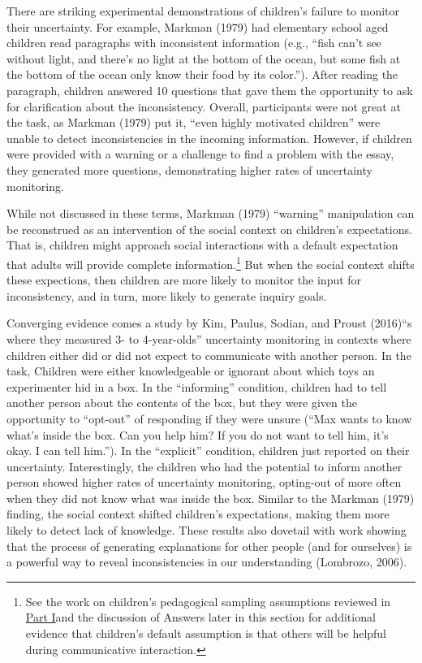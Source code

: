 \documentclass[english,floatsintext,man]{apa6}
\theoremstyle{definition}
\theoremstyle{definition}
\theoremstyle{definition}
\theoremstyle{remark}
\begin{document}
There are striking experimental demonstrations of children's failure to
monitor their uncertainty. For example, Markman (1979) had elementary
school aged children read paragraphs with inconsistent information
(e.g., \enquote{fish can't see without light, and there's no light at
the bottom of the ocean, but some fish at the bottom of the ocean only
know their food by its color.}). After reading the paragraph, children
answered 10 questions that gave them the opportunity to ask for
clarification about the inconsistency. Overall, participants were not
great at the task, as Markman (1979) put it, \enquote{even highly
motivated children} were unable to detect inconsistencies in the
incoming information. However, if children were provided with a warning
or a challenge to find a problem with the essay, they generated more
questions, demonstrating higher rates of uncertainty monitoring.

While not discussed in these terms, Markman (1979) \enquote{warning}
manipulation can be reconstrued as an intervention of the social context
on children's expectations. That is, children might approach social
interactions with a default expectation that adults will provide
complete information.\footnote{See the work on children's pedagogical
  sampling assumptions reviewed in \protect\hyperlink{p1}{Part I}and the
  discussion of Answers later in this section for additional evidence
  that children's default assumption is that others will be helpful
  during communicative interaction.} But when the social context shifts
these expections, then children are more likely to monitor the input for
inconsistency, and in turn, more likely to generate inquiry goals.

Converging evidence comes a study by Kim, Paulus, Sodian, and Proust
(2016)\enquote{s where they measured 3- to 4-year-olds} uncertainty
monitoring in contexts where children either did or did not expect to
communicate with another person. In the task, Children were either
knowledgeable or ignorant about which toys an experimenter hid in a box.
In the \enquote{informing} condition, children had to tell another
person about the contents of the box, but they were given the
opportunity to \enquote{opt-out} of responding if they were unsure
(\enquote{Max wants to know what's inside the box. Can you help him? If
you do not want to tell him, it's okay. I can tell him.}). In the
\enquote{explicit} condition, children just reported on their
uncertainty. Interestingly, the children who had the potential to inform
another person showed higher rates of uncertainty monitoring, opting-out
of more often when they did not know what was inside the box. Similar to
the Markman (1979) finding, the social context shifted children's
expectations, making them more likely to detect lack of knowledge. These
results also dovetail with work showing that the process of generating
explanations for other people (and for ourselves) is a powerful way to
reveal inconsistencies in our understanding (Lombrozo, 2006).
\end{document}
